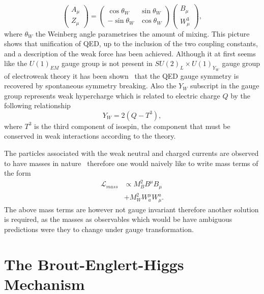 \begin{equation}
  \label{eq:ew-mixing}
  \begin{pmatrix} A_\mu \\ Z_\mu
  \end{pmatrix} =
  \begin{pmatrix} \cos{\theta_W} & \sin{\theta_W} \\ -\sin{\theta_W} &
\cos{\theta_W}
  \end{pmatrix}
  \begin{pmatrix} B_\mu \\ W_\mu^3
  \end{pmatrix},
\end{equation} where $\theta_W$ the Weinberg angle parametrises the amount of
mixing. This picture shows that unification of QED, up to the inclusion of the
two coupling constants, and a description of the weak force has been achieved.
Although it at first seems like the $U(1)_{EM}$ gauge group is not present in
$SU(2)_{L} \times U(1)_{Y_{W}}$ gauge group of electroweak theory it has been
shown~\cite{halzen} that the QED gauge symmetry is recovered by spontaneous
symmetry breaking. Also the $Y_W$ subscript in the gauge group represents weak
hypercharge which is related to electric charge $Q$ by the following
relationship
\begin{equation} Y_W = 2(Q - T^3),
\end{equation} where $T^3$ is the third component of isospin, the component that
must be conserved in weak interactions according to the theory.

The particles associated with the weak neutral and charged currents are observed
to have masses in nature~\cite{w-ua1, w-ua2, z-ua1, z-ua2} therefore one would
naively like to write mass terms of the form
\begin{align} \mathcal{L}_{mass} &\propto M^{2}_{B}B^{\mu}B_{\mu} \\ &+
M^{2}_{W}W^{\mu}_{a}W^{a}_{\mu}.
\end{align} The above mass terms are however not gauge invariant therefore
another solution is required, as the masses as observables which would be have
ambiguous predictions were they to change under gauge transformation.


\section{The Brout-Englert-Higgs Mechanism}%
\label{sec:higgs-mech}

